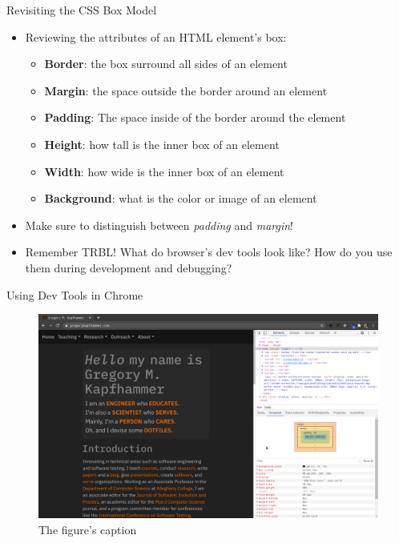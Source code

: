\documentclass[14pt,aspectratio=169]{beamer}
\begin{document}
%
\begin{frame}{Revisiting the CSS Box Model}
  \begin{itemize}
    \item Reviewing the attributes of an HTML element's box:
      \begin{itemize}
        \item {\bf Border}: the box surround all sides of an element
        \item {\bf Margin}: the space outside the border around an element
        \item {\bf Padding}: The space inside of the border around the element
        \item {\bf Height}: how tall is the inner box of an element
        \item {\bf Width}: how wide is the inner box of an element
        \item {\bf Background}: what is the color or image of an element
      \end{itemize}
      \vspace*{-.2in}
    \item Make sure to distinguish between {\em padding} and {\em margin}!
      \vspace*{-.2in}
    \item Remember TRBL! What do browser's dev tools look like? How do
      you use them during development and debugging?
  \end{itemize}
\end{frame}

%
\begin{frame}{Using Dev Tools in Chrome}
  \begin{figure}
    \centering
    \includegraphics[scale=.085]{images/chrome-dev-tools.png}
    \caption{The figure's caption}
  \end{figure}
\end{frame}
\end{document}
